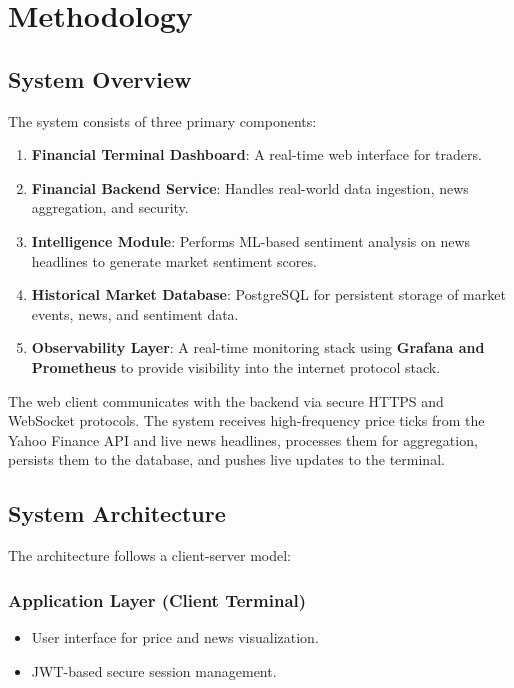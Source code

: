 \chapter{Methodology}

\section{System Overview}

The system consists of three primary components:

\begin{enumerate}
    \item \textbf{Financial Terminal Dashboard}: A real-time web interface for traders.
    \item \textbf{Financial Backend Service}: Handles real-world data ingestion, news aggregation, and security.
    \item \textbf{Intelligence Module}: Performs ML-based sentiment analysis on news headlines to generate market sentiment scores.
    \item \textbf{Historical Market Database}: PostgreSQL for persistent storage of market events, news, and sentiment data.
    \item \textbf{Observability Layer}: A real-time monitoring stack using \textbf{Grafana and Prometheus} to provide visibility into the internet protocol stack.
\end{enumerate}

The web client communicates with the backend via secure HTTPS and WebSocket protocols. The system receives high-frequency price ticks from the Yahoo Finance API and live news headlines, processes them for aggregation, persists them to the database, and pushes live updates to the terminal.

\section{System Architecture}

The architecture follows a client-server model:

\subsection*{Application Layer (Client Terminal)}
\begin{itemize}
    \item User interface for price and news visualization.
    \item JWT-based secure session management.
\end{itemize}

